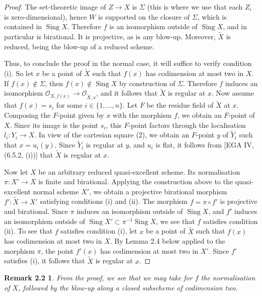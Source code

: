 \documentclass[11pt]{article}
\newcommand{\OO}{\mathcal O}
\newcommand{\Sing}{\operatorname{Sing}}
\newtheorem*{sourceremark}{Remark 2.2}
\begin{document}
\begin{proof}
The set-theoretic image of $Z\to X$ is $\Sigma$ (this is where we use that each $Z_i$ is zero-dimensional), hence $W$ is supported on the closure of $\Sigma$, which is contained in $\Sing X$. Therefore $f$ is an isomorphism outside of $\Sing X$, and in particular is birational. It is projective, as is any blow-up. Moreover, $\widetilde X$ is reduced, being the blow-up of a reduced scheme.

Thus, to conclude the proof in the normal case, it will suffice to verify condition (i). So let $x$ be a point of $\widetilde X$ such that $f(x)$ has codimension at most two in $X$. If $f(x)\notin\Sigma$, then $f(x)\notin\Sing X$ by construction of $\Sigma$. Therefore $f$ induces an isomorphism $\OO_{X,f(x)}\to\OO_{\widetilde X,x}$, and it follows that $\widetilde X$ is regular at $x$. Now assume that $f(x)=s_i$ for some $i\in\{1,\ldots,n\}$. Let $F$ be the residue field of $\widetilde X$ at $x$. Composing the $F$-point given by $x$ with the morphism $f$, we obtain an $F$-point of $X$. Since its image is the point $s_i$, this $F$-point factors through the localisation $l_i:Y_i\to X$. In view of the cartesian square (2), we obtain an $F$-point $y$ of $\widetilde Y_i$ such that $x=u_i(y)$. Since $\widetilde Y_i$ is regular at $y$, and $u_i$ is flat, it follows from [EGA IV, (6.5.2, (i))] that $\widetilde X$ is regular at $x$.

Now let $X$ be an arbitrary reduced quasi-excellent scheme. Its normalisation $\pi:X'\to X$ is finite and birational. Applying the construction above to the quasi-excellent normal scheme $X'$, we obtain a projective birational morphism $f':\widetilde X\to X'$ satisfying conditions (i) and (ii). The morphism $f=\pi\circ f'$ is projective and birational. Since $\pi$ induces an isomorphism outside of $\Sing X$, and $f'$ induces an isomorphism outside of $\Sing X'\subset\pi^{-1}\Sing X$, we see that $f$ satisfies condition (ii). To see that $f$ satisfies condition (i), let $x$ be a point of $\widetilde X$ such that $f(x)$ has codimension at most two in $X$. By Lemma 2.4 below applied to the morphism $\pi$, the point $f'(x)$ has codimension at most two in $X'$. Since $f'$ satisfies (i), it follows that $\widetilde X$ is regular at $x$.
\end{proof}

\begin{sourceremark}
From the proof, we see that we may take for $f$ the normalisation of $X$, followed by the blow-up along a closed subscheme of codimension two.
\end{sourceremark}
\end{document}
